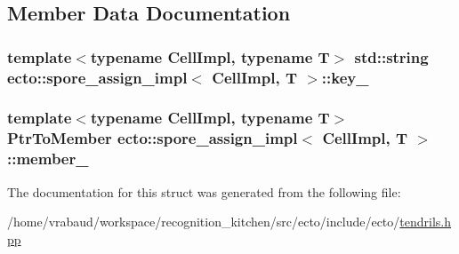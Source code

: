 \subsection{Member Data Documentation}
\hypertarget{structecto_1_1spore__assign__impl_a961946cb7f186c6a836467363b747915}{
\subsubsection[{key\-\_\-}]{\setlength{\rightskip}{0pt plus 5cm}template$<$typename Cell\-Impl, typename T$>$ std\-::string {\bf ecto\-::spore\-\_\-assign\-\_\-impl}$<$ Cell\-Impl, T $>$\-::key\-\_\-}}\label{structecto_1_1spore__assign__impl_a961946cb7f186c6a836467363b747915}
\hypertarget{structecto_1_1spore__assign__impl_a8d8ead313308f3ecfb7d5f2ed4fbe975}{
\subsubsection[{member\-\_\-}]{\setlength{\rightskip}{0pt plus 5cm}template$<$typename Cell\-Impl, typename T$>$ {\bf Ptr\-To\-Member} {\bf ecto\-::spore\-\_\-assign\-\_\-impl}$<$ Cell\-Impl, T $>$\-::member\-\_\-}}\label{structecto_1_1spore__assign__impl_a8d8ead313308f3ecfb7d5f2ed4fbe975}


The documentation for this struct was generated from the following file\-:\begin{DoxyCompactItemize}
\item 
/home/vrabaud/workspace/recognition\-\_\-kitchen/src/ecto/include/ecto/\hyperlink{tendrils_8hpp}{tendrils.\-hpp}\end{DoxyCompactItemize}
